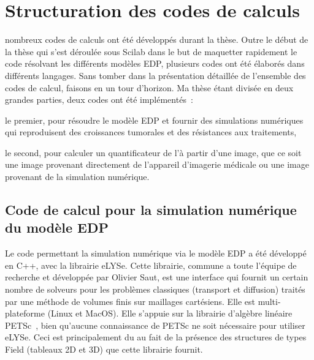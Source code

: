 \documentclass[main.tex]{subfiles}
\begin{document}
\chapter{Structuration des codes de calculs \label{chap:structure_code} }
 nombreux codes de calculs ont été développés durant la thèse. Outre le début de la thèse qui s'est déroulée sous Scilab dans le but de maquetter rapidement le code résolvant les différents modèles EDP, plusieurs codes ont été élaborés dans différents langages. 
Sans tomber dans la présentation détaillée de l'ensemble des codes de calcul,  %
faisons en un tour d'horizon. 
Ma thèse étant divisée en deux grandes parties, deux codes ont été 
implémentés~: 
\begin{myitemize}
\item le premier, pour résoudre le modèle EDP et fournir des simulations numériques qui reproduisent des croissances tumorales et des résistances aux traitements,
\item le second, pour calculer un quantificateur de l'\hetero à partir d'une image, que ce soit une image provenant directement de l'appareil d'imagerie médicale ou une image provenant de la simulation numérique.
\end{myitemize}  

\section{Code de calcul pour la simulation numérique du modèle EDP\label{sec:code_modeleEDP}}
Le code permettant la simulation numérique via le modèle EDP a été développé en C++, avec la librairie eLYSe. Cette librairie, commune a toute l'équipe de recherche et développée par Olivier Saut, est une interface qui fournit un certain nombre de solveurs pour les problèmes classiques (transport et diffusion) traités par une méthode de volumes finis sur maillages cartésiens. Elle est multi-plateforme (Linux et MacOS). 
Elle s'appuie sur la librairie d'algèbre linéaire PETSc~\cite{balay2012zhang,balay2012petsc}, bien qu'aucune connaissance de PETSc ne soit nécessaire pour utiliser eLYSe. 
Ceci est principalement du au fait de la présence des structures de types Field (tableaux 2D et 3D) que cette librairie fournit. 
\end{document}
